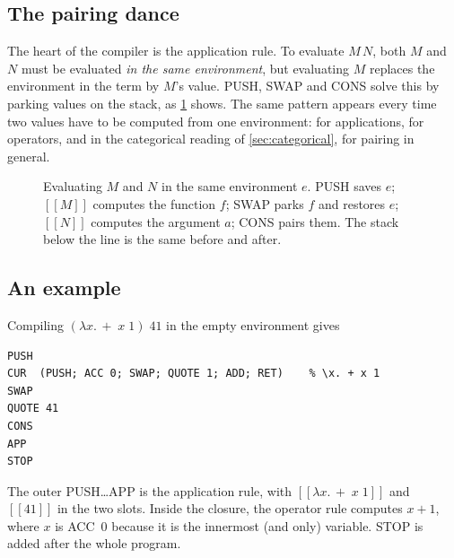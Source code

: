 \documentclass[11pt,a4paper]{article}
\newcommand{\ins}[1]{\textsf{#1}}
\newcommand{\pr}[2]{(#1,\, #2)}
\newcommand{\sem}[1]{[\![#1]\!]}
\theoremstyle{definition}
\theoremstyle{plain}
\begin{document}
\subsection{The pairing dance}\label{sec:dance}

The heart of the compiler is the application rule. To evaluate $M\,N$, both
$M$ and $N$ must be evaluated \emph{in the same environment}, but evaluating
$M$ replaces the environment in the term by $M$'s value. \ins{PUSH},
\ins{SWAP} and \ins{CONS} solve this by parking values on the stack, as
\cref{fig:dance} shows. The same pattern appears every time two values have
to be computed from one environment: for applications, for operators, and in
the categorical reading of \cref{sec:categorical}, for pairing in general.

\begin{figure}[t]
\centering
{}
\caption{Evaluating $M$ and $N$ in the same environment $e$. \ins{PUSH}
saves $e$; $\sem{M}$ computes the function $f$; \ins{SWAP} parks $f$ and
restores $e$; $\sem{N}$ computes the argument $a$; \ins{CONS} pairs them. The
stack below the line is the same before and after.}
\label{fig:dance}
\end{figure}

\subsection{An example}

Compiling $(\lambda x.\,{+}\;x\;1)\;41$ in the empty environment gives
\begin{lstlisting}[style=cam]
PUSH
CUR  (PUSH; ACC 0; SWAP; QUOTE 1; ADD; RET)    % \x. + x 1
SWAP
QUOTE 41
CONS
APP
STOP
\end{lstlisting}
The outer \ins{PUSH}\dots\ins{APP} is the application rule, with
$\sem{\lambda x.\,{+}\;x\;1}$ and $\sem{41}$ in the two slots. Inside the
closure, the operator rule computes $x+1$, where $x$ is \ins{ACC}~0 because
it is the innermost (and only) variable. \ins{STOP} is added after the whole
program.
\end{document}
